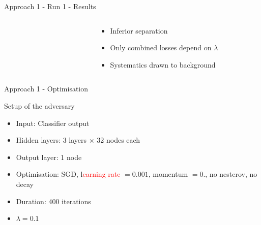 \begin{frame}{Approach 1 - Run 1 - Results}
\begin{columns}
\begin{column}{0.5\textwidth}
\begin{figure}
    \end{figure}
    \end{column}
    \begin{column}{0.5\textwidth}
    \begin{itemize}
        \item Inferior separation
        \item Only combined losses depend on $\lambda$
        \item Systematics drawn to background
    \end{itemize}
    \end{column}
    \end{columns}
\end{frame}

\begin{frame}{Approach 1 - Optimisation}
\begin{block}{Setup of the adversary}
    \begin{itemize}
    \item Input: Classifier output
    \item Hidden layers: \num{3} \ELU layers $\times$ \num{32} nodes each
    \item Output layer: \num{1} \SIGMOID node
    \item Optimisation: SGD, l\textcolor{red}{earning rate} $=0.001$, momentum $=0.$, no nesterov, no decay
    \item Duration: 400 iterations
    \item $\lambda = 0.1$
    \end{itemize}
    \end{block}
\end{frame}

